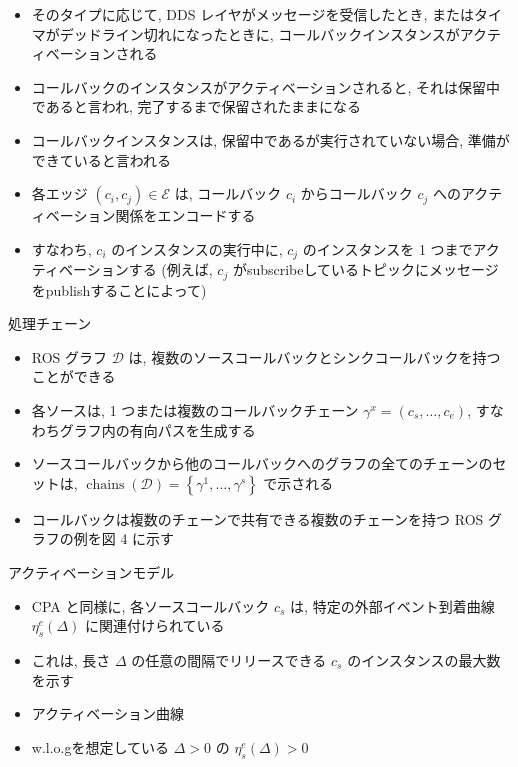 \begin{frame}{}
    \begin{itemize}
        \item そのタイプに応じて, DDS レイヤがメッセージを受信したとき, またはタイマがデッドライン切れになったときに, コールバックインスタンスがアクティベーションされる
\item コールバックのインスタンスがアクティベーションされると, それは保留中であると言われ, 完了するまで保留されたままになる
\item コールバックインスタンスは, 保留中であるが実行されていない場合, 準備ができていると言われる
\item 各エッジ $\left(c_{i}, c_{j}\right) \in \mathcal{E}$ は, コールバック $c_{i}$ からコールバック $c_{j}$ へのアクティベーション関係をエンコードする
\item すなわち, $c_{i}$ のインスタンスの実行中に, $c_{j}$ のインスタンスを 1 つまでアクティベーションする (例えば, $c_{j}$ がsubscribeしているトピックにメッセージをpublishすることによって)
    \end{itemize}
\end{frame}

\begin{frame}{処理チェーン}
    \begin{itemize}
        \item ROS グラフ $\mathcal{D}$ は, 複数のソースコールバックとシンクコールバックを持つことができる
\item 各ソースは, 1 つまたは複数のコールバックチェーン $\gamma^{x}=\left(c_{s}, \ldots, c_{e}\right)$, すなわちグラフ内の有向パスを生成する
\item ソースコールバックから他のコールバックへのグラフの全てのチェーンのセットは, $\operatorname{chains}(\mathcal{D})=\left\{\gamma^{1}, \ldots, \gamma^{s}\right\}$ で示される
\item コールバックは複数のチェーンで共有できる複数のチェーンを持つ ROS グラフの例を図 4 に示す
    \end{itemize}
\end{frame}

\begin{frame}{アクティベーションモデル}
    \begin{itemize}
        \item CPA と同様に, 各ソースコールバック $c_{s}$ は, 特定の外部イベント到着曲線 $\eta_{s}^{e}(\Delta)$ に関連付けられている
\item これは, 長さ $\Delta$ の任意の間隔でリリースできる $c_{s}$ のインスタンスの最大数を示す
\item アクティベーション曲線
\item w.l.o.gを想定している $\Delta>0$ の $\eta_{s}^{e}(\Delta)>0$
    \end{itemize}
\end{frame}

